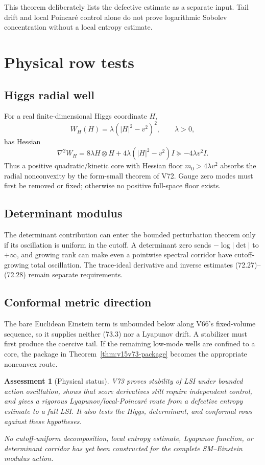 \documentclass[11pt]{article}
\newtheorem{assessment}[theorem]{Assessment}
\theoremstyle{remark}
\begin{document}
This theorem deliberately lists the defective estimate as a
separate input.  Tail drift and local Poincar\'e control alone do
not prove logarithmic Sobolev concentration without a local
entropy estimate.

\section{Physical row tests}

\subsection{Higgs radial well}

For a real finite-dimensional Higgs coordinate \(H\),
\[
 W_H(H)=\lambda(|H|^2-v^2)^2,\qquad\lambda>0,
\]
has Hessian
\[
 \nabla^2W_H
 =
 8\lambda H\otimes H+
 4\lambda(|H|^2-v^2)I
 \succeq-4\lambda v^2I.                               \tag{73.27}
\]
Thus a positive quadratic/kinetic core with Hessian floor
\(m_0>4\lambda v^2\) absorbs the radial nonconvexity by the
form-small theorem of V72.  Gauge zero modes must first be removed
or fixed; otherwise no positive full-space floor exists.

\subsection{Determinant modulus}

The determinant contribution can enter the bounded perturbation
theorem only if its oscillation is uniform in the cutoff.  A
determinant zero sends
\(-\log|\det|\) to \(+\infty\), and growing rank can make even a
pointwise spectral corridor have cutoff-growing total oscillation.
The trace-ideal derivative and inverse estimates (72.27)--(72.28)
remain separate requirements.

\subsection{Conformal metric direction}

The bare Euclidean Einstein term is unbounded below along V66's
fixed-volume sequence, so it supplies neither (73.3) nor a
Lyapunov drift.  A stabilizer must first produce the coercive tail.
If the remaining low-mode wells are confined to a core, the
package in Theorem~\ref{thm:v15v73-package} becomes the appropriate
nonconvex route.

\begin{assessment}[Physical status]
\label{ass:v15v73-status}
V73 proves stability of LSI under bounded action oscillation,
shows that score derivatives still require independent control,
and gives a rigorous Lyapunov/local-Poincar\'e route from a
defective entropy estimate to a full LSI.  It also tests the Higgs,
determinant, and conformal rows against these hypotheses.

No cutoff-uniform decomposition, local entropy estimate, Lyapunov
function, or determinant corridor has yet been constructed for the
complete SM--Einstein modulus action.
\end{assessment}
\end{document}
